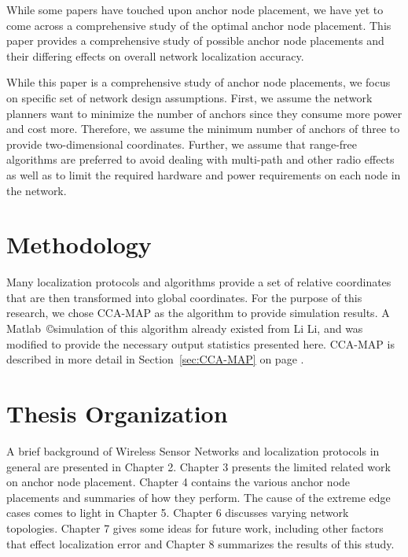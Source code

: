 While some papers have touched upon anchor node placement, we have yet to come across a comprehensive study of the optimal anchor node placement.  This paper provides a comprehensive study of possible anchor node placements and their differing effects on overall network localization accuracy.

While this paper is a comprehensive study of anchor node placements, we focus on specific set of network design assumptions.  First, we assume the network planners want to minimize the number of anchors since they consume more power and cost more.  Therefore, we assume the minimum number of anchors of three to provide two-dimensional coordinates. Further, we assume that range-free algorithms are preferred to avoid dealing with multi-path and other radio effects as well as to limit the required hardware and power requirements on each node in the network.  

\section{Methodology}
Many localization protocols and algorithms provide a set of relative coordinates that are then transformed into global coordinates.  For the purpose of this research, we chose CCA-MAP\cite{CCA-MAP07,CCA-MAP09} as the algorithm to provide simulation results.  A Matlab~\copyright simulation of this algorithm already existed from Li Li\cite{CCA-MAP07}, and was modified to provide the necessary output statistics presented here.  CCA-MAP is described in more detail in Section~\ref{sec:CCA-MAP} on page \pageref{sec:CCA-MAP}.

\section{Thesis Organization}
A brief background of Wireless Sensor Networks and localization protocols in general are presented in Chapter 2.  Chapter 3 presents the limited related work on anchor node placement.  Chapter 4 contains the various anchor node placements and summaries of how they perform.  The cause of the extreme edge cases comes to light in Chapter 5.  Chapter 6 discusses varying network topologies. Chapter 7 gives some ideas for future work, including other factors that effect localization error and Chapter 8 summarizes the results of this study.


